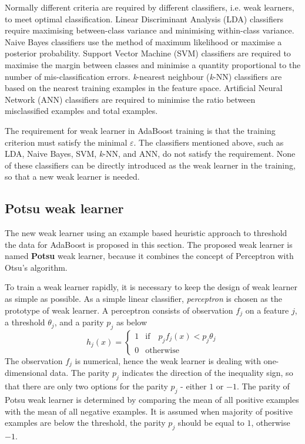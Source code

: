 \documentclass[a4paper,10pt]{article}
\begin{document}
Normally different criteria are required by different classifiers, i.e. weak learners, to meet optimal classification. Linear Discriminant Analysis (LDA) classifiers require maximising between-class variance and minimising within-class variance. Naive Bayes classifiers use the method of maximum likelihood or maximise a posterior probability. Support Vector Machine (SVM) classifiers are required to maximise the margin between classes and minimise a quantity proportional to the number of mis-classification errors. \textit{k}-nearest neighbour (\textit{k}-NN) classifiers are based on the nearest training examples in the feature space. Artificial Neural Network (ANN) classifiers are required to minimise the ratio between misclassified examples and total examples. 

The requirement for weak learner in AdaBoost training is that the training criterion must satisfy the minimal $\varepsilon$. The classifiers mentioned above, such as LDA, Naive Bayes, SVM, \textit{k}-NN, and ANN, do not satisfy the requirement. None of these classifiers can be directly introduced as the weak learner in the training, so that a new weak learner is needed.

\subsection{Potsu weak learner}
The new weak learner using an example based heuristic approach to threshold the data for AdaBoost is proposed in this section. The proposed weak learner is named \textbf{Potsu} weak learner, because it combines the concept of Perceptron with Otsu's algorithm. 

To train a weak learner rapidly, it is necessary to keep the design of weak learner as simple as possible. As a simple linear classifier, \textit{perceptron} \cite{Gallant1990} is chosen as the prototype of weak learner. A perceptron consists of observation $f_{j}$ on a feature $j$, a threshold $\theta_{j}$, and a parity $p_{j}$ as below
\begin{equation}
 h_{j}(x)=\left\{
		 \begin{array}{ll}
		  1 & \textrm{if} \quad p_{j}f_{j}(x)<p_{j}\theta_{j}\\
		  0 & \textrm{otherwise}
		 \end{array}
		\right. 
\label{eq:perceptron}
\end{equation}
The observation $f_{j}$ is numerical, hence the weak learner is dealing with one-dimensional data. The parity $p_{j}$ indicates the direction of the inequality sign, so that there are only two options for the parity $p_{j}$ - either $1$ or $-1$. The parity of Potsu weak learner is determined by comparing the mean of all positive examples with the mean of all negative examples. It is assumed when majority of positive examples are below the threshold, the parity $p_{j}$ should be equal to $1$, otherwise $-1$.
\end{document}
